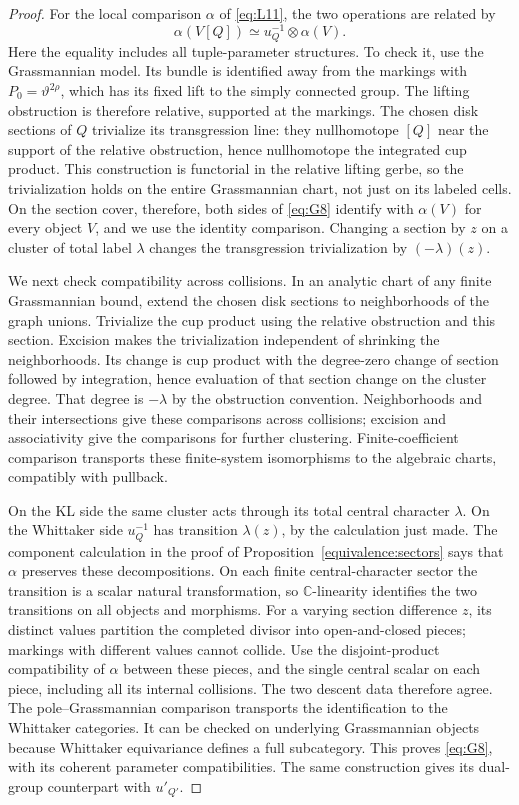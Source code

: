 \begin{proof}
For the local comparison \(\alpha\) of \eqref{eq:L11}, the two
operations are related by
\begin{equation}\label{eq:G8}
 \alpha(V[Q])\simeq u_Q^{-1}\otimes\alpha(V).
\end{equation}
Here the equality includes all tuple-parameter structures.  To check
it, use the Grassmannian model.  Its bundle is identified away from
the markings with \(P_0=\vartheta^{2\rho}\), which has its fixed
lift to the simply connected group.  The lifting obstruction is
therefore relative, supported at the markings.  The chosen disk
sections of \(Q\) trivialize its transgression line: they nullhomotope
\([Q]\) near the support of the relative obstruction, hence nullhomotope
the integrated cup product.  This construction is functorial in the
relative lifting gerbe, so the trivialization holds on the entire
Grassmannian chart, not just on its labeled cells.  On the section
cover, therefore, both sides of \eqref{eq:G8} identify with
\(\alpha(V)\) for every object \(V\), and we use the identity
comparison.  Changing a section by \(z\) on a cluster of total label
\(\lambda\) changes the transgression trivialization by
\((-\lambda)(z)\).

We next check compatibility across collisions.  In an analytic chart of any finite
Grassmannian bound, extend the chosen disk sections to neighborhoods
of the graph unions.  Trivialize the cup product using the relative
obstruction and this section.  Excision makes the trivialization
independent of shrinking the neighborhoods.  Its change is cup
product with the degree-zero change of section followed by
integration, hence evaluation of that section change on the cluster
degree.  That degree is \(-\lambda\) by the obstruction convention.
Neighborhoods and their intersections give these comparisons across
collisions; excision and associativity give the comparisons for
further clustering.  Finite-coefficient comparison transports these
finite-system isomorphisms to the algebraic charts, compatibly with
pullback.

On the KL side the same cluster acts through its total central
character \(\lambda\).  On the Whittaker side \(u_Q^{-1}\) has
transition \(\lambda(z)\), by the calculation just made.  The
component calculation in the proof of
Proposition~\ref{equivalence:sectors} says that \(\alpha\) preserves
these decompositions.  On each finite central-character sector the
transition is a scalar natural transformation, so \(\mathbb C\)-linearity
identifies the two transitions on all objects and morphisms.
For a varying section difference \(z\), its distinct values partition
the completed divisor into open-and-closed pieces; markings with
different values cannot collide.  Use the disjoint-product compatibility
of \(\alpha\) between these pieces, and the single central scalar
on each piece, including all its internal collisions.
The two descent data therefore agree.  The pole--Grassmannian comparison transports the
identification to the Whittaker categories.  It can be checked on
underlying Grassmannian objects because Whittaker equivariance
defines a full subcategory.  This proves \eqref{eq:G8}, with its
coherent parameter compatibilities.  The same construction gives
its dual-group counterpart with \(u'_{Q'}\).


\end{proof}
